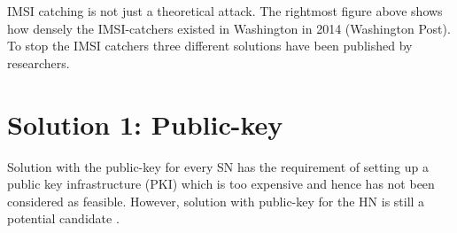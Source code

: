 \documentclass[portrait,a0]{a0poster}
\begin{document}
\begin{multicols}{2}
\begin{center}
\begin{minipage}[t]{0.3\linewidth}
\hspace{0pt}
\end{minipage}
\newline
\end{center}

IMSI catching is not just a theoretical attack. The rightmost figure above shows how densely the IMSI-catchers existed in Washington in 2014 (Washington Post). To stop the IMSI catchers three different solutions have been published by researchers. 



\section{Solution 1: Public-key}
Solution with the public-key for every SN has the requirement of setting up a public key infrastructure (PKI) which is too expensive and hence has not been considered as feasible. However, solution with public-key for the HN is still a potential candidate \citep{Ginzboorg_Niemi_2016}.


\end{multicols}
\end{document}
